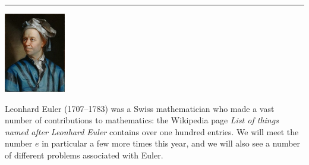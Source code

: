 \begin{questions}
\begin{parts}
            \begin{center}\noindent\rule{8cm}{0.4pt}\end{center}

            \begin{center}
              \includegraphics[width=0.2\textwidth]{euler}
            \end{center}
            Leonhard Euler (1707--1783) was a Swiss mathematician who made a vast number of contributions to mathematics: the
            Wikipedia page \emph{List of things named after Leonhard Euler} contains over one hundred entries. We will meet the number $ e $
            in particular a few more times this year, and we will also see a number of different problems associated with Euler.
    \end{parts}
\end{questions}


